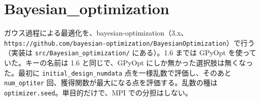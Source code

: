 \section{Bayesian\_optimization}

ガウス過程による最適化を、bayesian-optimization（3.x、\texttt{https:/\allowbreak{}/\allowbreak{}github.\allowbreak{}com/\allowbreak{}bayesian-optimization/\allowbreak{}BayesianOptimization}）で行う（実装は \texttt{src/\allowbreak{}Bayesian\_\allowbreak{}optimization/\allowbreak{}} にある）。1.6 までは GPyOpt を使っていた。キーの名前は 1.6 と同じで、GPyOpt にしか無かった選択肢は無くなった。最初に \texttt{initial\_\allowbreak{}design\_\allowbreak{}numdata} 点を一様乱数で評価し、そのあと \texttt{num\_\allowbreak{}optiter} 回、獲得関数が最大になる点を評価する。乱数の種は \texttt{optimizer.\allowbreak{}seed}。単目的だけで、MPI での分担はしない。

